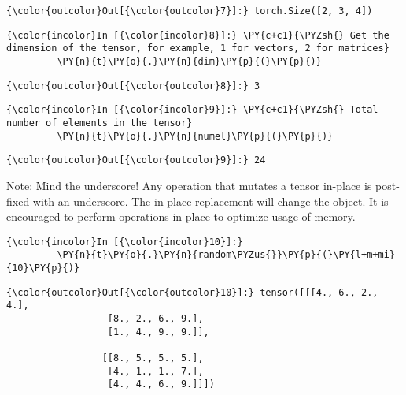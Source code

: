 \begin{Verbatim}[commandchars=\\\{\}]
{\color{outcolor}Out[{\color{outcolor}7}]:} torch.Size([2, 3, 4])
\end{Verbatim}
            
\begin{Verbatim}[commandchars=\\\{\}]
{\color{incolor}In [{\color{incolor}8}]:} \PY{c+c1}{\PYZsh{} Get the dimension of the tensor, for example, 1 for vectors, 2 for matrices}
         \PY{n}{t}\PY{o}{.}\PY{n}{dim}\PY{p}{(}\PY{p}{)} 
\end{Verbatim}


\begin{Verbatim}[commandchars=\\\{\}]
{\color{outcolor}Out[{\color{outcolor}8}]:} 3
\end{Verbatim}
            
\begin{Verbatim}[commandchars=\\\{\}]
{\color{incolor}In [{\color{incolor}9}]:} \PY{c+c1}{\PYZsh{} Total number of elements in the tensor}
         \PY{n}{t}\PY{o}{.}\PY{n}{numel}\PY{p}{(}\PY{p}{)} 
\end{Verbatim}


\begin{Verbatim}[commandchars=\\\{\}]
{\color{outcolor}Out[{\color{outcolor}9}]:} 24
\end{Verbatim}
 
Note: Mind the underscore! 
Any operation that mutates a tensor in-place is post-fixed with an underscore. 
The in-place replacement will change the object. It is encouraged to perform operations in-place to optimize usage of memory.
            
\begin{Verbatim}[commandchars=\\\{\}]
{\color{incolor}In [{\color{incolor}10}]:} 
         \PY{n}{t}\PY{o}{.}\PY{n}{random\PYZus{}}\PY{p}{(}\PY{l+m+mi}{10}\PY{p}{)} 
\end{Verbatim}


\begin{Verbatim}[commandchars=\\\{\}]
{\color{outcolor}Out[{\color{outcolor}10}]:} tensor([[[4., 6., 2., 4.],
                  [8., 2., 6., 9.],
                  [1., 4., 9., 9.]],
         
                 [[8., 5., 5., 5.],
                  [4., 1., 1., 7.],
                  [4., 4., 6., 9.]]])
\end{Verbatim}
            

